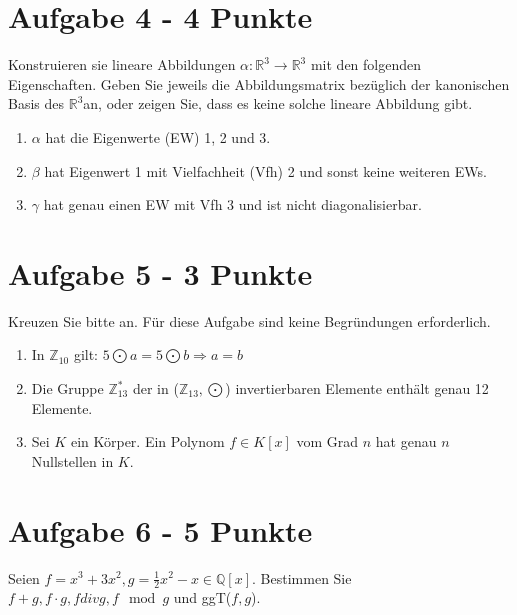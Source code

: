 \section*{Aufgabe 4 - 4 Punkte}
Konstruieren sie lineare Abbildungen $\alpha: \mathbb{R}^3 \rightarrow \mathbb{R}^3$ mit den folgenden Eigenschaften.
Geben Sie jeweils die Abbildungsmatrix bezüglich der kanonischen Basis des $\mathbb{R}^3$an, oder zeigen Sie, dass es keine solche lineare Abbildung gibt.
\begin{enumerate}[label=\alph*)]
\item $\alpha$ hat die Eigenwerte (EW) 1, 2 und 3.
\item $\beta$ hat Eigenwert 1 mit Vielfachheit (Vfh) 2 und sonst keine weiteren EWs.
\item $\gamma$ hat genau einen EW mit Vfh 3 und ist nicht diagonalisierbar.
\end{enumerate}
\section*{Aufgabe 5 - 3 Punkte}
 Kreuzen Sie bitte an. Für diese Aufgabe sind keine Begründungen erforderlich.
\begin{enumerate}[label=\alph*)]
\item In $\mathbb{Z}_{10}$ gilt: $5 \bigodot a = 5 \bigodot b \Rightarrow a = b$
\item Die Gruppe $\mathbb{Z}_{13}^{*}$ der in ($\mathbb{Z}_{13}, \bigodot$) invertierbaren Elemente enthält genau 12 Elemente.
\item Sei $K$ ein Körper. Ein Polynom $f \in K[x]$ vom Grad $n$ hat genau $n$ Nullstellen in $K$.
\end{enumerate}
\section*{Aufgabe 6 - 5 Punkte}
Seien $f = x^3 + 3x^2 , g = \frac{1}{2}x^2 - x \in \mathbb{Q} [x]$. Bestimmen Sie $f+g, f\cdot g, f div g, f \mod g$ und ggT($f,g$).
